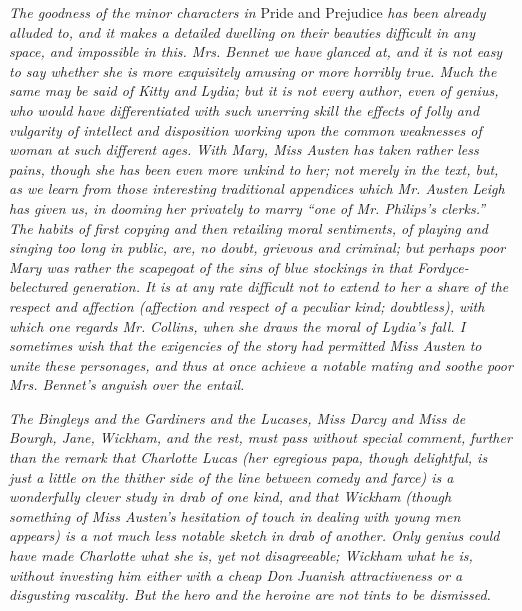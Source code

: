 \documentclass[12pt,openright]{book}
\begin{document}
\textit{The goodness of the minor characters in} Pride and Prejudice \textit{has been}\textit{ }\textit{already alluded to, and it makes a detailed dwelling on their beauties}\textit{ }\textit{difficult in any space, and impossible in this. Mrs. Bennet we have}\textit{ }\textit{glanced at, and it is not easy to say whether she is more exquisitely}\textit{ }\textit{amusing or more horribly true. Much the same may be said of Kitty and}\textit{ }\textit{Lydia; but it is not every author, even of genius, who would have}\textit{ }\textit{differentiated with such unerring skill the effects of folly and}\textit{ }\textit{vulgarity of intellect and disposition working upon the common}\textit{ }\textit{weaknesses of woman at such different ages. With Mary, Miss Austen has}\textit{ }\textit{taken rather less pains, though she has been even more unkind to her;}\textit{ }\textit{not merely in the text, but, as we learn from those interesting}\textit{ }\textit{traditional appendices which Mr. Austen Leigh has given us, in dooming}\textit{ }\textit{her privately to marry “one of Mr. Philips’s clerks.” The habits of}\textit{ }\textit{first copying and then retailing moral sentiments, of playing and}\textit{ }\textit{singing too long in public, are, no doubt, grievous and criminal; but}\textit{ }\textit{perhaps poor Mary was rather the scapegoat of the sins of blue stockings}\textit{ }\textit{in that Fordyce-belectured generation. It is at any rate difficult not}\textit{ }\textit{to extend to her a share of the respect and affection (affection and}\textit{ }\textit{respect of a peculiar kind; doubtless), with which one regards Mr.}\textit{ }\textit{Collins, when she draws the moral of Lydia’s fall. I}\textit{ }\textit{sometimes wish}\textit{ }\textit{that the exigencies of the story had permitted Miss Austen to unite}\textit{ }\textit{these personages, and thus at once achieve a notable mating and soothe}\textit{ }\textit{poor Mrs. Bennet’s anguish over the entail.}

\textit{The Bingleys and the Gardiners and the Lucases, Miss Darcy and Miss de}\textit{ }\textit{Bourgh, Jane, Wickham, and the rest, must pass without special comment,}\textit{ }\textit{further than the remark that Charlotte Lucas (her egregious papa, though}\textit{ }\textit{delightful, is just a little on the thither side of the line between}\textit{ }\textit{comedy and farce) is a wonderfully clever study in drab of one kind, and}\textit{ }\textit{that Wickham (though something of Miss Austen’s hesitation of touch in}\textit{ }\textit{dealing with young men appears) is a not much less notable sketch in}\textit{ }\textit{drab of another. Only genius could have made Charlotte what she is, yet}\textit{ }\textit{not disagreeable; Wickham what he is, without investing him either with}\textit{ }\textit{a cheap Don Juanish attractiveness or a disgusting rascality. But the}\textit{ }\textit{hero and the heroine are not tints to be dismissed.}
\end{document}
